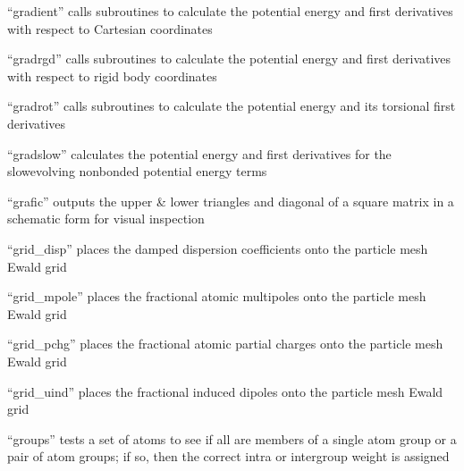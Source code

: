 \documentclass[letterpaper,11pt,english]{sphinxmanual}
\begin{document}
\sphinxAtStartPar
“gradient” calls subroutines to calculate the potential energy and first derivatives with respect to Cartesian coordinates

\sphinxAtStartPar
{}

\sphinxAtStartPar
“gradrgd” calls subroutines to calculate the potential energy and first derivatives with respect to rigid body coordinates

\sphinxAtStartPar
{}

\sphinxAtStartPar
“gradrot” calls subroutines to calculate the potential energy and its torsional first derivatives

\sphinxAtStartPar
{}

\sphinxAtStartPar
“gradslow” calculates the potential energy and first derivatives for the slow\sphinxhyphen{}evolving nonbonded potential energy terms

\sphinxAtStartPar
{}

\sphinxAtStartPar
“grafic” outputs the upper \& lower triangles and diagonal of a square matrix in a schematic form for visual inspection

\sphinxAtStartPar
{}

\sphinxAtStartPar
“grid\_disp” places the damped dispersion coefficients onto the particle mesh Ewald grid

\sphinxAtStartPar
{}

\sphinxAtStartPar
“grid\_mpole” places the fractional atomic multipoles onto the particle mesh Ewald grid

\sphinxAtStartPar
{}

\sphinxAtStartPar
“grid\_pchg” places the fractional atomic partial charges onto the particle mesh Ewald grid

\sphinxAtStartPar
{}

\sphinxAtStartPar
“grid\_uind” places the fractional induced dipoles onto the particle mesh Ewald grid

\sphinxAtStartPar
{}

\sphinxAtStartPar
“groups” tests a set of atoms to see if all are members of a single atom group or a pair of atom groups; if so, then the correct intra\sphinxhyphen{} or intergroup weight is assigned
\end{document}
